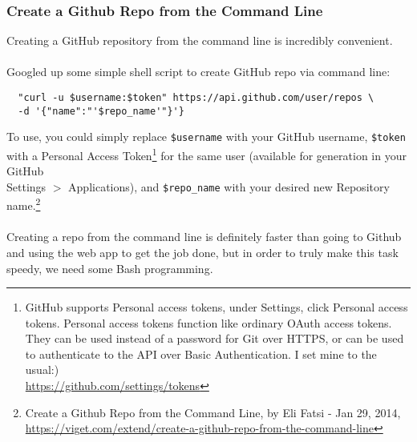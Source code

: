 \documentclass[12pt,letterpaper,dvips]{article}
\newcommand{\cmd}[1]{\texttt{#1}}
\begin{document}
\subsubsection{Create a Github Repo from the Command Line}
Creating a GitHub repository from the command line is incredibly
convenient.
\\
\\
Googled up some simple shell script to create GitHub repo via
command line:

\begin{verbatim}
  "curl -u $username:$token" https://api.github.com/user/repos \
  -d '{"name":"'$repo_name'"}'}
\end{verbatim}

\noindent To use, you could simply replace \cmd{\$username} with your
GitHub username, \cmd{\$token} with a Personal Access Token\footnote{GitHub
supports Personal access tokens, under Settings, click Personal access
tokens. Personal access tokens function like ordinary OAuth access tokens.
They can be used instead of a password for Git over HTTPS, or can be used
to authenticate to the API over Basic Authentication.  I set mine to the usual:)\\
\href{https://github.com/settings/tokens}{https://github.com/settings/tokens}}
for the same user (available for generation in your GitHub\\
Settings $>$ Applications), and \cmd{\$repo\_name} with your
desired new Repository name.\footnote{Create a Github Repo
from the Command Line, by Eli Fatsi - Jan 29, 2014,\\
\href{https://viget.com/extend/create-a-github-repo-from-the-command-line}{https://viget.com/extend/create-a-github-repo-from-the-command-line}}
\\
\\
Creating a repo from the command line is definitely faster
than going to Github and using the web app to get the job
done, but in order to truly make this task speedy, we need
some Bash programming.
\end{document}
